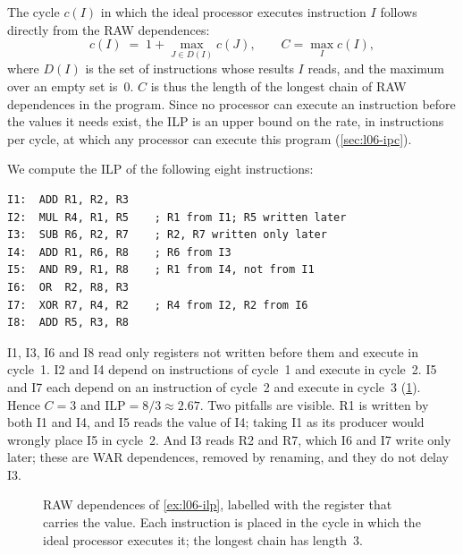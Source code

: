 \documentclass[../main.tex]{subfiles}
\begin{document}
The cycle $c(I)$ in which the ideal processor executes instruction $I$
follows directly from the RAW dependences:
\begin{equation}
  c(I) \;=\; 1 + \max_{J \in D(I)} c(J) ,
  \qquad C = \max_{I} c(I) ,
  \label{eq:l06-cycle}
\end{equation}
where $D(I)$ is the set of instructions whose results $I$ reads, and the
maximum over an empty set is~0.  $C$ is thus the length of the longest chain
of RAW dependences in the program.  Since no processor can execute an
instruction before the values it needs exist, the ILP is an upper bound on the
rate, in instructions per cycle, at which any processor can execute this
program (\cref{sec:l06-ipc}).

\begin{example}
  \label{ex:l06-ilp}
  We compute the ILP of the following eight instructions:
  \begin{lstlisting}[language={[x86masm]Assembler}, numbers=none]
I1:  ADD R1, R2, R3
I2:  MUL R4, R1, R5    ; R1 from I1; R5 written later
I3:  SUB R6, R2, R7    ; R2, R7 written only later
I4:  ADD R1, R6, R8    ; R6 from I3
I5:  AND R9, R1, R8    ; R1 from I4, not from I1
I6:  OR  R2, R8, R3
I7:  XOR R7, R4, R2    ; R4 from I2, R2 from I6
I8:  ADD R5, R3, R8
\end{lstlisting}
  I1, I3, I6 and I8 read only registers not written before them and execute
  in cycle~1.  I2 and I4 depend on instructions of cycle~1 and execute in
  cycle~2.  I5 and I7 each depend on an instruction of cycle~2 and execute
  in cycle~3 (\cref{fig:l06-ilp-graph}).  Hence $C=3$ and
  $\text{ILP} = 8/3 \approx 2.67$.  Two pitfalls are visible.  R1 is written
  by both I1 and I4, and I5 reads the value of I4; taking I1 as its producer
  would wrongly place I5 in cycle~2.  And I3 reads R2 and R7, which I6 and I7
  write only later; these are WAR dependences, removed by renaming, and they
  do not delay I3.
\end{example}

\begin{figure}[htbp]
  \centering
  
  \caption{RAW dependences of \cref{ex:l06-ilp}, labelled with the register
    that carries the value.  Each instruction is placed in the cycle in which
    the ideal processor executes it; the longest chain has length~3.}
  \label{fig:l06-ilp-graph}
\end{figure}
\end{document}
